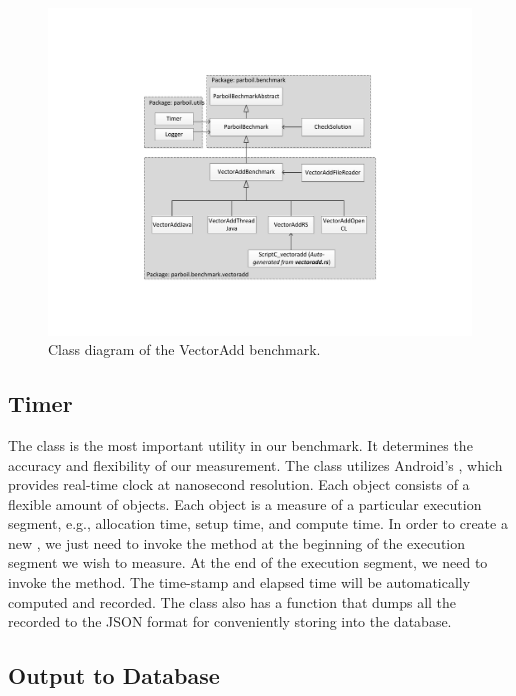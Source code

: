 \begin{figure}[t!]
\includegraphics[scale=0.5]{figs/vectoradd_class_diagram.pdf}
\caption{Class diagram of the VectorAdd benchmark.}
\label{fig:class_diagram}
\centering
\end{figure}

\subsection*{Timer}
The  class is the most important utility in our benchmark. It
determines the accuracy and flexibility of our measurement. The 
class utilizes Android's , which provides real-time clock at
nanosecond resolution. Each  object consists of a flexible amount of
 objects. Each  object is a measure of a
particular execution segment, e.g., allocation time, setup time, and compute
time. In order to create a new , we
just need to invoke the  method at the beginning of the execution
segment we wish to measure. At the end of the execution segment, we need to
invoke the  method. The time-stamp and elapsed time will be
automatically computed and recorded. The  class also has a function that
dumps all the recorded  to the JSON format for conveniently storing
into the database.


\subsection*{Output to Database}


